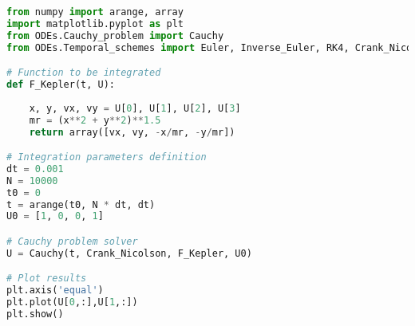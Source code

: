 \begin{lstlisting}[language=Python, caption=Código principal del Hito 2, label=Hito_2_main_code]
from numpy import arange, array
import matplotlib.pyplot as plt
from ODEs.Cauchy_problem import Cauchy
from ODEs.Temporal_schemes import Euler, Inverse_Euler, RK4, Crank_Nicolson

# Function to be integrated
def F_Kepler(t, U):
    
    x, y, vx, vy = U[0], U[1], U[2], U[3]
    mr = (x**2 + y**2)**1.5
    return array([vx, vy, -x/mr, -y/mr])

# Integration parameters definition
dt = 0.001
N = 10000
t0 = 0
t = arange(t0, N * dt, dt)
U0 = [1, 0, 0, 1]

# Cauchy problem solver
U = Cauchy(t, Crank_Nicolson, F_Kepler, U0)

# Plot results
plt.axis('equal')
plt.plot(U[0,:],U[1,:])
plt.show()

\end{lstlisting}











